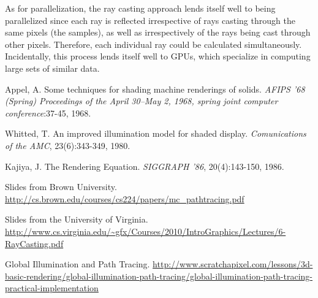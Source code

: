 \documentclass[journal]{IEEEtran}
\begin{document}
\par
As for parallelization, the ray casting approach lends itself well to being parallelized since each ray is reflected irrespective of rays casting through the same pixels (the samples), as well as irrespectively of the rays being cast through other pixels. Therefore, each individual ray could be calculated simultaneously. Incidentally, this process lends itself well to GPUs, which specialize in computing large sets of similar data.


\begin{thebibliography}{5}

Appel, A. Some techniques for shading machine renderings of solids. \emph{AFIPS '68 (Spring) Proceedings of the April 30--May 2, 1968, spring joint computer conference}:37-45, 1968.

Whitted, T. An improved illumination model for shaded display. \emph{Comunications of the AMC}, 23(6):343-349, 1980.

Kajiya, J. The Rendering Equation. \emph{SIGGRAPH '86}, 20(4):143-150, 1986.

Slides from Brown University.
\url{http://cs.brown.edu/courses/cs224/papers/mc_pathtracing.pdf}

Slides from the University of Virginia.
\url{http://www.cs.virginia.edu/~gfx/Courses/2010/IntroGraphics/Lectures/6-RayCasting.pdf}

Global Illumination and Path Tracing.
\url{http://www.scratchapixel.com/lessons/3d-basic-rendering/global-illumination-path-tracing/global-illumination-path-tracing-practical-implementation}

\end{thebibliography}

\end{document}
